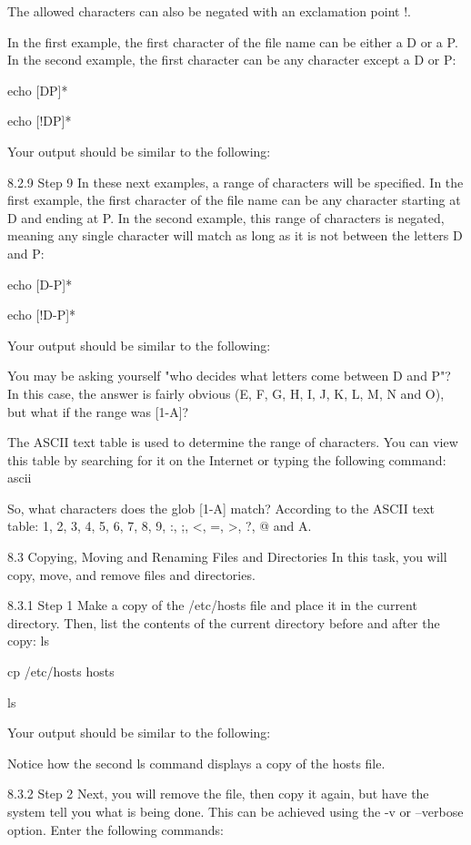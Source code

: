 The allowed characters can also be negated with an exclamation point !.

In the first example, the first character of the file name can be either a D or a P. In the second
example, the first character can be any character except a D or P:

echo [DP]*

echo [!DP]*

Your output should be similar to the following:

8.2.9 Step 9
In these next examples, a range of characters will be specified. In the first example, the first
character of the file name can be any character starting at D and ending at P. In the second
example, this range of characters is negated, meaning any single character will match as long as
it is not between the letters D and P:

echo [D-P]*

echo [!D-P]*

Your output should be similar to the following:

You may be asking yourself "who decides what letters come between D and P"? In this case, the
answer is fairly obvious (E, F, G, H, I, J, K, L, M, N and O), but what if the range was [1-A]?

The ASCII text table is used to determine the range of characters. You can view this table by
searching for it on the Internet or typing the following command: ascii

So, what characters does the glob [1-A] match? According to the ASCII text table: 1, 2, 3, 4, 5,
6, 7, 8, 9, :, ;, <, =, >, ?, @ and A.



8.3 Copying, Moving and Renaming Files
and Directories
In this task, you will copy, move, and remove files and directories.

8.3.1 Step 1
Make a copy of the /etc/hosts file and place it in the current directory. Then, list the contents
of the current directory before and after the copy:
ls

cp /etc/hosts hosts

ls

Your output should be similar to the following:

Notice how the second ls command displays a copy of the hosts file.

8.3.2 Step 2
Next, you will remove the file, then copy it again, but have the system tell you what is being done.
This can be achieved using the -v or --verbose option. Enter the following commands:

